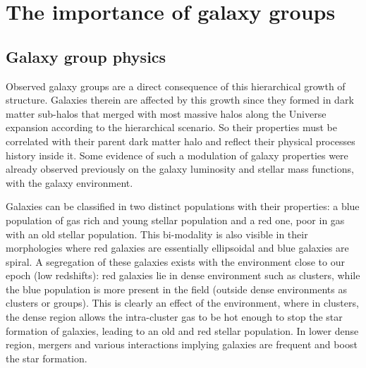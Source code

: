 \section{The importance of galaxy groups}
\label{sec:the_importance_of_galaxy_groups}

\subsection{Galaxy group physics}
\label{sub:galaxy_group_physics}

Observed galaxy groups are a direct consequence of this hierarchical growth
of structure. Galaxies therein are affected by this growth since they formed
in dark matter sub-halos that merged with most massive halos along the
Universe expansion according to the hierarchical scenario. So their
properties must be correlated with their parent dark matter halo and reflect
their physical processes history inside it. Some evidence of such a
modulation of galaxy properties were already observed previously on the
galaxy luminosity \citep{Robotham+10} and stellar mass \citep{Yang+09}
functions, with the galaxy environment.

Galaxies can be classified in two distinct populations with their
properties: a blue population of gas rich and young stellar population and a
red one, poor in gas with an old stellar population. This bi-modality is
also visible in their morphologies where red galaxies are essentially
ellipsoidal and blue galaxies are spiral. A segregation of these galaxies
exists with the environment close to our epoch (low redshifts): red galaxies
lie in dense environment such as clusters, while the blue population is more
present in the field (outside dense environments as clusters or groups).
This is clearly an effect of the environment, where in clusters, the dense
region allows the intra-cluster gas to be hot enough to stop the star
formation of galaxies, leading to an old and red stellar population. In
lower dense region, mergers and various interactions implying galaxies are
frequent and boost the star formation.

